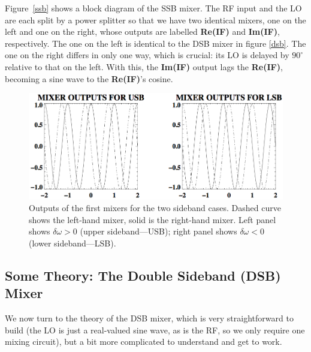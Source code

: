 \documentclass[12pt,preprint]{aastex}
\begin{document}
Figure\ \ref{ssb} shows a block diagram of the SSB mixer.  The RF input
and the LO are each split by a power splitter so that we have two
identical mixers, one on the left and one on the right, whose outputs
are labelled {\bf Re(IF)} and {\bf Im(IF)}, respectively. The one on
the left is identical to the DSB mixer in figure \ref{dsb}. The one on
the right differs in only one way, which is crucial: its LO is delayed
by $90^\circ$ relative to that on the left. With this, the {\bf Im(IF)}
output lags the {\bf Re(IF)}, becoming a sine wave to the {\bf Re(IF)}'s 
cosine.

\begin{figure}[h]
        \includegraphics[width=6.5in]{ssbm.png}
\caption{Outputs of the first mixers for the two sideband cases. Dashed
  curve shows the left-hand mixer, solid is the right-hand
  mixer. Left panel shows $\delta \omega > 0$ (upper
  sideband---USB); right panel shows $\delta \omega < 0$ (lower
  sideband---LSB).
\label{mixerout}}
\end{figure}


\subsection {Some Theory: The Double Sideband (DSB) Mixer}
%
We now turn to the theory of the DSB mixer, which
is very straightforward to build (the LO is just a real-valued sine wave, as is the RF, so we only
require one mixing circuit),
but a bit more complicated to understand and get to work.  
\end{document}
